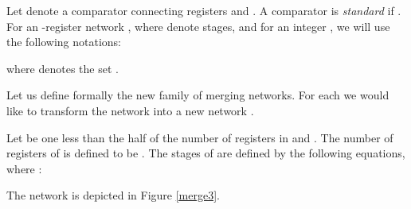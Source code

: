 \documentclass{llncs}
\begin{document}
Let  denote a comparator connecting registers  and . A
comparator  is {\em standard} if .  For an -register
network , where  denote
stages, and for an integer , we will use the
following notations:

where  denotes the set
.

Let us define formally the new family of merging networks.  For each
 we would like to transform the network  into a new
network . 
\begin{definition}\label{defMk}
  Let  be one less than the half of the number of
  registers in  and . The number of registers of 
  is defined to be . The stages of  are defined by
  the following equations, where :

\end{definition}

The network  is depicted in Figure \ref{merge3}.
\end{document}
